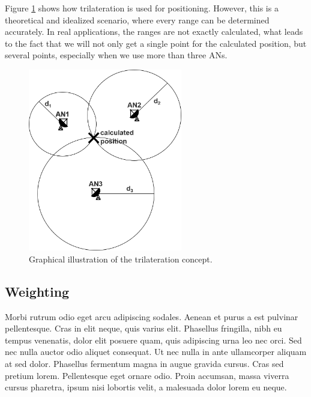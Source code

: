 Figure \ref{fig:trilateration} shows how trilateration is used for positioning. However, this is a theoretical and idealized scenario, where every range can be determined accurately. In real applications, the ranges are not exactly calculated, what leads to the fact that we will not only get a single point for the calculated position, but several points, especially when we use more than three ANs.

\begin{figure}[th]
\centering
\includegraphics[width=0.6\textwidth]{Figures/trilateration}
\decoRule
\caption[Trilateration]{Graphical illustration of the trilateration concept.}
\label{fig:trilateration}
\end{figure}


\subsection{Weighting}
Morbi rutrum odio eget arcu adipiscing sodales. Aenean et purus a est pulvinar pellentesque. Cras in elit neque, quis varius elit. Phasellus fringilla, nibh eu tempus venenatis, dolor elit posuere quam, quis adipiscing urna leo nec orci. Sed nec nulla auctor odio aliquet consequat. Ut nec nulla in ante ullamcorper aliquam at sed dolor. Phasellus fermentum magna in augue gravida cursus. Cras sed pretium lorem. Pellentesque eget ornare odio. Proin accumsan, massa viverra cursus pharetra, ipsum nisi lobortis velit, a malesuada dolor lorem eu neque.


